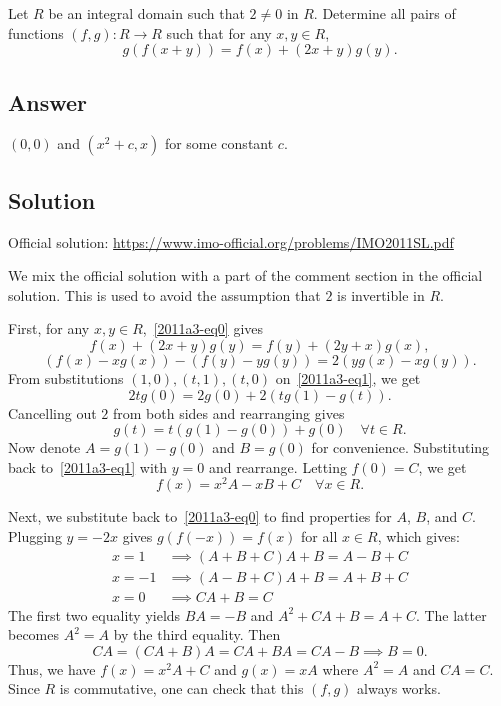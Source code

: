 Let $R$ be an integral domain such that $2 \neq 0$ in $R$.
Determine all pairs of functions $(f, g) : R \to R$ such that for any $x, y \in R$,
\[ g(f(x + y)) = f(x) + (2x + y) g(y). \tag{*}\label{2011a3-eq0} \]



\subsection*{Answer}

$(0, 0)$ and $(x^2 + c, x)$ for some constant $c$.



\subsection*{Solution}

Official solution: \url{https://www.imo-official.org/problems/IMO2011SL.pdf}

We mix the official solution with a part of the comment section in the official solution.
This is used to avoid the assumption that $2$ is invertible in $R$.

First, for any $x, y \in R$,~\eqref{2011a3-eq0} gives
\[ f(x) + (2x + y) g(y) = f(y) + (2y + x) g(x), \]
\[ (f(x) - x g(x)) - (f(y) - y g(y)) = 2 (y g(x) - x g(y)). \tag{1}\label{2011a3-eq1} \]
From substitutions $(1, 0), (t, 1), (t, 0)$ on~\eqref{2011a3-eq1}, we get
\[ 2 t g(0) = 2 g(0) + 2 (t g(1) - g(t)). \]
Cancelling out $2$ from both sides and rearranging gives
\[ g(t) = t (g(1) - g(0)) + g(0) \quad \forall t \in R. \tag{2}\label{2011a3-eq2} \]
Now denote $A = g(1) - g(0)$ and $B = g(0)$ for convenience.
Substituting back to~\eqref{2011a3-eq1} with $y = 0$ and rearrange.
Letting $f(0) = C$, we get
\[ f(x) = x^2 A - xB + C \quad \forall x \in R. \tag{3}\label{2011a3-eq3} \]

Next, we substitute back to~\eqref{2011a3-eq0} to find properties for $A$, $B$, and $C$.
Plugging $y = -2x$ gives $g(f(-x)) = f(x)$ for all $x \in R$, which gives:
\begin{align*}
    x = 1 &\implies (A + B + C)A + B = A - B + C \\
    x = -1 &\implies (A - B + C)A + B = A + B + C \\
    x = 0 &\implies CA + B = C
\end{align*}
The first two equality yields $BA = -B$ and $A^2 + CA + B = A + C$.
The latter becomes $A^2 = A$ by the third equality.
Then \[ CA = (CA + B)A = CA + BA = CA - B \implies B = 0. \]
Thus, we have $f(x) = x^2 A + C$ and $g(x) = xA$ where $A^2 = A$ and $CA = C$.
Since $R$ is commutative, one can check that this $(f, g)$ always works.

